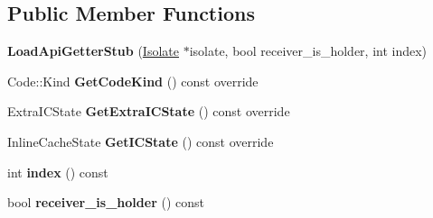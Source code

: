 \subsection*{Public Member Functions}
\begin{DoxyCompactItemize}
\item 
{\bfseries Load\+Api\+Getter\+Stub} (\hyperlink{classv8_1_1internal_1_1_isolate}{Isolate} $\ast$isolate, bool receiver\+\_\+is\+\_\+holder, int index)\hypertarget{classv8_1_1internal_1_1_load_api_getter_stub_a22079d58faccdb1bf7ad888629c9904a}{}\label{classv8_1_1internal_1_1_load_api_getter_stub_a22079d58faccdb1bf7ad888629c9904a}

\item 
Code\+::\+Kind {\bfseries Get\+Code\+Kind} () const  override\hypertarget{classv8_1_1internal_1_1_load_api_getter_stub_aa556edd41e9eb65ecd6d88676106cfbe}{}\label{classv8_1_1internal_1_1_load_api_getter_stub_aa556edd41e9eb65ecd6d88676106cfbe}

\item 
Extra\+I\+C\+State {\bfseries Get\+Extra\+I\+C\+State} () const  override\hypertarget{classv8_1_1internal_1_1_load_api_getter_stub_a39f3885f4e2408ee01e868af7b329f63}{}\label{classv8_1_1internal_1_1_load_api_getter_stub_a39f3885f4e2408ee01e868af7b329f63}

\item 
Inline\+Cache\+State {\bfseries Get\+I\+C\+State} () const  override\hypertarget{classv8_1_1internal_1_1_load_api_getter_stub_a9ea966d3d0ae0798b5609e8c1aa1b6b0}{}\label{classv8_1_1internal_1_1_load_api_getter_stub_a9ea966d3d0ae0798b5609e8c1aa1b6b0}

\item 
int {\bfseries index} () const \hypertarget{classv8_1_1internal_1_1_load_api_getter_stub_a47c3ae14624908cce171ac1c865f7739}{}\label{classv8_1_1internal_1_1_load_api_getter_stub_a47c3ae14624908cce171ac1c865f7739}

\item 
bool {\bfseries receiver\+\_\+is\+\_\+holder} () const \hypertarget{classv8_1_1internal_1_1_load_api_getter_stub_a3ebb43e6da64eef60dc3e2f7c9227215}{}\label{classv8_1_1internal_1_1_load_api_getter_stub_a3ebb43e6da64eef60dc3e2f7c9227215}

\end{DoxyCompactItemize}
